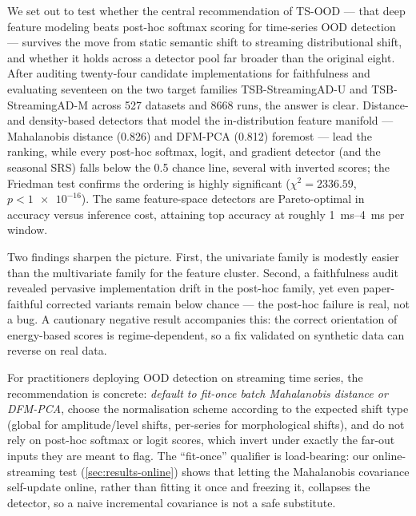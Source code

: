 \documentclass[11pt]{article}
\begin{document}
We set out to test whether the central recommendation of TS-OOD \citep{Gungor2025}
--- that deep feature modeling beats post-hoc softmax scoring for time-series OOD
detection --- survives the move from static semantic shift to streaming
distributional shift, and whether it holds across a detector pool far broader than
the original eight. After auditing twenty-four candidate implementations for
faithfulness and evaluating seventeen on the two target families TSB-StreamingAD-U
and TSB-StreamingAD-M across \num{527} datasets and \num{8668} runs, the answer is
clear. Distance- and density-based detectors that model the in-distribution feature
manifold --- Mahalanobis distance (\num{0.826}) and DFM-PCA (\num{0.812}) foremost
--- lead the ranking, while every post-hoc softmax, logit, and gradient detector
(and the seasonal SRS) falls below the \num{0.5} chance line, several with inverted
scores; the Friedman test confirms the ordering is highly significant ($\chi^2 =
\num{2336.59}$, $p < \num{1e-16}$). The same feature-space detectors are
Pareto-optimal in accuracy versus inference cost, attaining top accuracy at roughly
\SIrange{1}{4}{\milli\second} per window.

Two findings sharpen the picture. First, the univariate family is modestly easier
than the multivariate family for the feature cluster. Second, a faithfulness audit
revealed pervasive implementation drift in the post-hoc family, yet even
paper-faithful corrected variants remain below chance --- the post-hoc failure is
real, not a bug. A cautionary negative result accompanies this: the correct
orientation of energy-based scores is regime-dependent, so a fix validated on
synthetic data can reverse on real data.

For practitioners deploying OOD detection on streaming time series, the
recommendation is concrete: \emph{default to fit-once batch Mahalanobis distance or
DFM-PCA}, choose the normalisation scheme according to the expected shift type
(global for amplitude/level shifts, per-series for morphological shifts), and do not
rely on post-hoc softmax or logit scores, which invert under exactly the far-out
inputs they are meant to flag. The ``fit-once'' qualifier is load-bearing: our
online-streaming test (\cref{sec:results-online}) shows that letting the Mahalanobis
covariance self-update online, rather than fitting it once and freezing it,
collapses the detector, so a naive incremental covariance is not a safe substitute.
\end{document}
